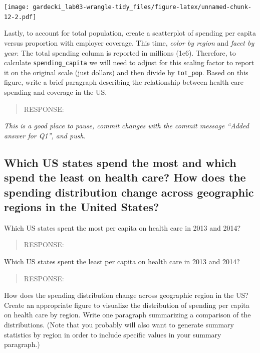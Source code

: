 \documentclass[
]{article}
\begin{document}
\texttt{[image: gardecki\_lab03-wrangle-tidy\_files/figure-latex/unnamed-chunk-12-2.pdf]}

Lastly, to account for total population, create a scatterplot of
spending per capita versus proportion with employer coverage. This time,
\emph{color by region} and \emph{facet by year}. The total spending
column is reported in millions (1e6). Therefore, to calculate
\texttt{spending\_capita} we will need to adjust for this scaling factor
to report it on the original scale (just dollars) and then divide by
\texttt{tot\_pop}. Based on this figure, write a brief paragraph
describing the relationship between health care spending and coverage in
the US.

\begin{quote}
RESPONSE:
\end{quote}

\emph{This is a good place to pause, commit changes with the commit
message ``Added answer for Q1'', and push.}

\hypertarget{which-us-states-spend-the-most-and-which-spend-the-least-on-health-care-how-does-the-spending-distribution-change-across-geographic-regions-in-the-united-states}{%
\subsection{Which US states spend the most and which spend the least on
health care? How does the spending distribution change across geographic
regions in the United
States?}\label{which-us-states-spend-the-most-and-which-spend-the-least-on-health-care-how-does-the-spending-distribution-change-across-geographic-regions-in-the-united-states}}

Which US states spent the most per capita on health care in 2013 and
2014?

\begin{quote}
RESPONSE:
\end{quote}

Which US states spent the least per capita on health care in 2013 and
2014?

\begin{quote}
RESPONSE:
\end{quote}

How does the spending distribution change across geographic region in
the US? Create an appropriate figure to visualize the distribution of
spending per capita on health care by region. Write one paragraph
summarizing a comparison of the distributions. (Note that you probably
will also want to generate summary statistics by region in order to
include specific values in your summary paragraph.)
\end{document}
